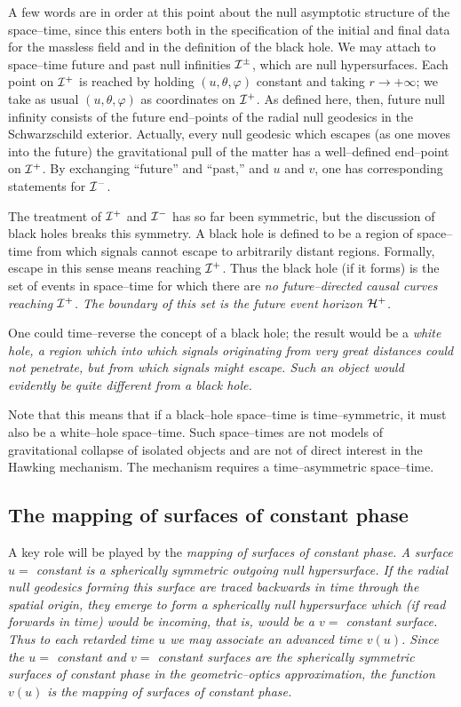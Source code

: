 A few words are in order at this point about the null asymptotic
structure of the space--time, since this enters both in the
specification of the initial and final data for the massless field and
in the definition of the black hole.  We may attach to space--time
future and past null infinities ${\cal I} ^\pm$, which are null
hypersurfaces.  Each point on ${\cal I} ^+$ is reached by holding
$(u,\theta ,\varphi )$ constant and taking $r\to +\infty$; we take as
usual $(u,\theta ,\varphi )$ as coordinates on ${\cal I} ^+$.  As defined
here, then, future null infinity consists of the future end--points of
the radial null geodesics in the Schwarzschild exterior.  Actually,
every null geodesic which escapes (as one moves into
the future) the gravitational pull of the matter has a well--defined
end--point on ${\cal I} ^+$.  By exchanging ``future'' and ``past,'' and
$u$ and $v$, one has corresponding statements for ${\cal I} ^-$.

The treatment of ${\cal I} ^+$ and ${\cal I} ^-$ has so far been symmetric,
but the discussion of black holes breaks this symmetry.  A black hole
is defined to be a region of space--time from which signals cannot
escape to arbitrarily distant regions.  Formally, escape in this sense
means reaching ${\cal I} ^+$.  Thus the black hole (if it forms) is the
set of events in space--time for which there are \it no \rm
future--directed causal curves reaching ${\cal I} ^+$.  The boundary of
this set is the future \it event horizon \rm ${\cal H}^+$.  

One could time--reverse the concept of a black hole; the result would
be a \it white hole, \rm a region which into which signals originating
from very great distances could not penetrate, but from which signals
might escape.  Such an object would evidently be quite different from
a black hole.  

Note that this means that if a black--hole space--time is time--symmetric, it
must also be a white--hole space--time.  Such space--times are not models of
gravitational collapse of isolated objects and are not of direct interest in
the Hawking mechanism.  The mechanism requires a time--asymmetric space--time.

\subsection{The mapping of surfaces of constant phase}

A key role will be played by the \it mapping of surfaces of constant
phase.  \rm  A surface $u=$ constant is a spherically symmetric
outgoing null hypersurface.  If the radial null geodesics forming this
surface are traced backwards in time through the spatial origin, they
emerge to form a spherically null hypersurface which (if read forwards
in time) would be incoming, that is, would be a $v=$ constant
surface.  Thus to each retarded time $u$ we may associate an advanced
time $v(u)$.  Since the $u=$ constant and $v=$ constant surfaces are the
spherically symmetric surfaces of constant phase in the
geometric--optics approximation, the function $v(u)$ is the mapping of
surfaces of constant phase.  

